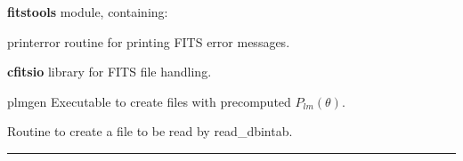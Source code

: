 \begin{modules}
  \begin{sulist}{} %
  \item[\textbf{fitstools}] module, containing:
  \item[printerror] routine for printing FITS error messages.
  \item[\textbf{cfitsio}] library for FITS file handling.		
  \end{sulist}
\end{modules}

\begin{related}
  \begin{sulist}{} %
  \item[plmgen] Executable to create files with precomputed $P_{lm}(\theta)$.
  \item[\htmlref{write\_dbintab}{sub:write_dbintab}] Routine to create a file to be read by read\_dbintab.
  \end{sulist}
\end{related}

\rule{\hsize}{2mm}

\newpage
